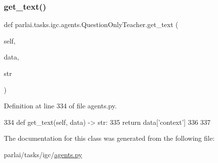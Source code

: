 \subsubsection{\texorpdfstring{get\+\_\+text()}{get\_text()}}
{\footnotesize\ttfamily def parlai.\+tasks.\+igc.\+agents.\+Question\+Only\+Teacher.\+get\+\_\+text (\begin{DoxyParamCaption}\item[{}]{self,  }\item[{}]{data,  }\item[{}]{str }\end{DoxyParamCaption})}



Definition at line 334 of file agents.\+py.


\begin{DoxyCode}
334     \textcolor{keyword}{def }get\_text(self, data) -> str:
335         \textcolor{keywordflow}{return} data[\textcolor{stringliteral}{'context'}]
336 
337 
\end{DoxyCode}


The documentation for this class was generated from the following file\+:\begin{DoxyCompactItemize}
\item 
parlai/tasks/igc/\hyperlink{parlai_2tasks_2igc_2agents_8py}{agents.\+py}\end{DoxyCompactItemize}
